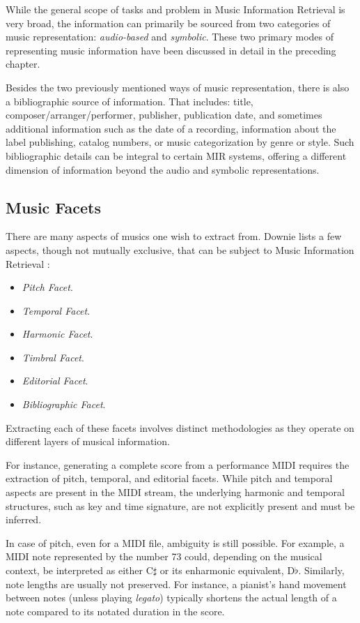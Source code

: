 While the general scope of tasks and problem in Music Information Retrieval is very broad, the information can primarily be sourced from two categories of music representation: \emph{audio-based} and \emph{symbolic}. These two primary modes of representing music information have been discussed in detail in the preceding chapter.

Besides the two previously mentioned ways of music representation, there is also a bibliographic source of information. That includes: title, composer/arranger/performer, publisher, publication date, and sometimes additional information such as the date of a recording, information about the label publishing, catalog numbers, or music categorization by genre or style. Such bibliographic details can be integral to certain MIR systems, offering a different dimension of information beyond the audio and symbolic representations.

\subsection{Music Facets}

There are many aspects of musics one wish to extract from. Downie lists a few aspects, though not mutually exclusive, that can be subject to Music Information Retrieval \cite{Downie2003}:
\begin{itemize}
	\item \emph{Pitch Facet}.
	\item \emph{Temporal Facet}.
	\item \emph{Harmonic Facet}.
	\item \emph{Timbral Facet}.
	\item \emph{Editorial Facet}.
	\item \emph{Bibliographic Facet}.
\end{itemize}

Extracting each of these facets involves distinct methodologies as they operate on different layers of musical information.

For instance, generating a complete score from a performance MIDI requires the extraction of pitch, temporal, and editorial facets. While pitch and temporal aspects are present in the MIDI stream, the underlying harmonic and temporal structures, such as key and time signature, are not explicitly present and must be inferred.

In case of pitch, even for a MIDI file, ambiguity is still possible. For example, a MIDI note represented by the number 73 could, depending on the musical context, be interpreted as either $\textrm{C}\sharp$ or its enharmonic equivalent, $\textrm{D}\flat$. Similarly, note lengths are usually not preserved. For instance, a pianist's hand movement between notes (unless playing \emph{legato}) typically shortens the actual length of a note compared to its notated duration in the score.

